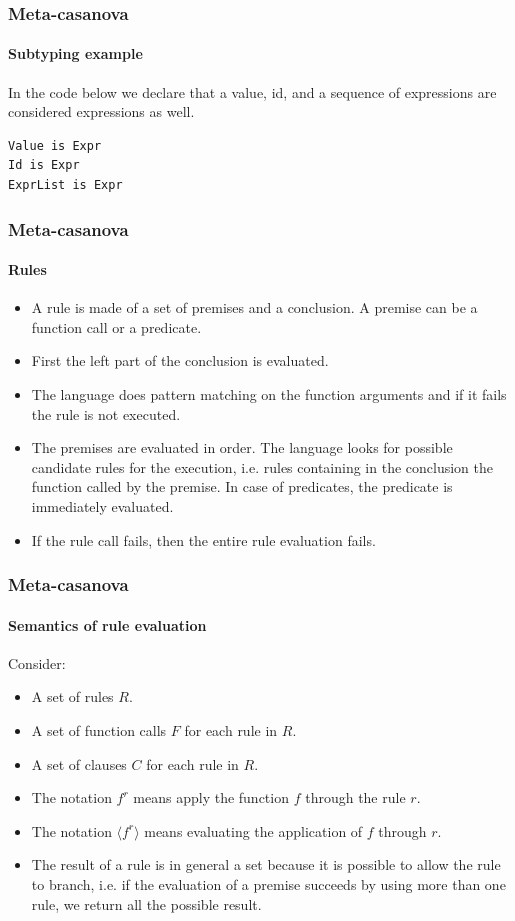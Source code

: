 \documentclass[mathserif,serif]{beamer}
\begin{document}
\begin{frame}[fragile]
	\frametitle{Meta-casanova}
	\framesubtitle{Subtyping example}
	
	In the code below we declare that a value, id, and a sequence of expressions are considered expressions as well.
		\begin{lstlisting}
Value is Expr
Id is Expr
ExprList is Expr
		\end{lstlisting}
\end{frame}

\begin{frame}
	\frametitle{Meta-casanova}
	\framesubtitle{Rules}
	
	\begin{itemize}
		\item A rule is made of a set of premises and a conclusion. A premise can be a function call or a predicate.
		\item First the left part of the conclusion is evaluated. 
		\item The language does pattern matching on the function arguments and if it fails the rule is not executed.
		\item The premises are evaluated in order. The language looks for possible candidate rules for the execution, i.e. rules containing in the conclusion the function called by the premise. In case of predicates, the predicate is immediately evaluated.
		\item If the rule call fails, then the entire rule evaluation fails.
	\end{itemize}
\end{frame}

\begin{frame}
	\frametitle{Meta-casanova}
	\framesubtitle{Semantics of rule evaluation}
	
	Consider:
	\begin{itemize}
		\item A set of rules $R$.
		\item A set of function calls $F$ for each rule in $R$.
		\item A set of clauses $C$ for each rule in $R$.
		\item The notation $f^{r}$ means apply the function $f$ through the rule $r$.
		\item The notation  $\langle f^{r} \rangle$ means evaluating the application of $f$ through $r$.
		\item The result of a rule is in general a set because it is possible to allow the rule to branch, i.e. if the evaluation of a premise succeeds by using more than one rule, we return all the possible result.
	\end{itemize}
\end{frame}
\end{document}
